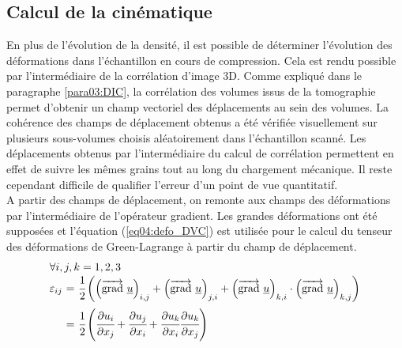 	\subsection{Calcul de la cinématique}\label{para04:cinematique}
		En plus de l'évolution de la densité, il est possible de déterminer l'évolution des déformations dans l'échantillon en cours de compression. Cela est rendu possible par l'intermédiaire de la corrélation d'image 3D. Comme expliqué dans le paragraphe \ref{para03:DIC}, la corrélation des volumes issus de la tomographie permet d'obtenir un champ vectoriel des déplacements au sein des volumes. La cohérence des champs de déplacement obtenus a été vérifiée visuellement sur plusieurs sous-volumes choisis aléatoirement dans l'échantillon scanné. Les déplacements obtenus par l'intermédiaire du calcul de corrélation permettent en effet de suivre les mêmes grains tout au long du chargement mécanique. Il reste cependant difficile de qualifier l'erreur d'un point de vue quantitatif.
		\\A partir des champs de déplacement, on remonte aux champs des déformations par l'intermédiaire de l'opérateur gradient. Les grandes déformations ont été supposées et l'équation (\ref{eq04:defo_DVC}) est utilisée pour le calcul du tenseur des déformations de Green-Lagrange à partir du champ de déplacement.
		\begin{equation}\label{eq04:defo_DVC}
		\begin{array}{r@{\ =\ }l}
			\multicolumn{2}{l}{\forall i,j,k = 1,2,3}\\
			\varepsilon_{ij} & \cfrac{1}{2}\left( \left(\grad\ \underline{u}\right)_{i,j} + \left(\grad\ \underline{u}\right)_{j,i} + \left(\grad\ \underline{u}\right)_{k,i} \cdot \left(\grad\ \underline{u}\right)_{k,j}\right)\vspace{2mm}\\
			 & \cfrac{1}{2}\left( \partialdiff{u_i}{x_j} + \partialdiff{u_j}{x_i} + \partialdiff{u_k}{x_i} \partialdiff{u_k}{x_j} \right)
		\end{array}
		\end{equation}
